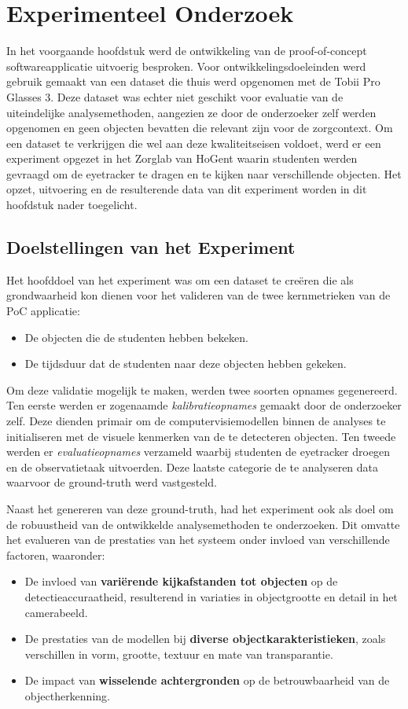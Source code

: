 \chapter{Experimenteel Onderzoek}
\label{ch:experiment}

In het voorgaande hoofdstuk werd de ontwikkeling van de proof-of-concept softwareapplicatie uitvoerig besproken.
Voor ontwikkelingsdoeleinden werd gebruik gemaakt van een dataset die thuis werd opgenomen met de Tobii Pro Glasses 3.
Deze dataset was echter niet geschikt voor evaluatie van de uiteindelijke analysemethoden, aangezien ze door de onderzoeker zelf werden opgenomen en geen objecten bevatten die relevant zijn voor de zorgcontext.
Om een dataset te verkrijgen die wel aan deze kwaliteitseisen voldoet, werd er een experiment opgezet in het Zorglab van HoGent waarin studenten werden gevraagd om de eyetracker te dragen en te kijken naar verschillende objecten.
Het opzet, uitvoering en de resulterende data van dit experiment worden in dit hoofdstuk nader toegelicht.

\section{Doelstellingen van het Experiment}

Het hoofddoel van het experiment was om een dataset te creëren die als grondwaarheid kon dienen voor het valideren van de twee kernmetrieken van de PoC applicatie:
\begin{itemize}
    \item De objecten die de studenten hebben bekeken.
    \item De tijdsduur dat de studenten naar deze objecten hebben gekeken.
\end{itemize}
Om deze validatie mogelijk te maken, werden twee soorten opnames gegenereerd. 
Ten eerste werden er zogenaamde \textit{kalibratieopnames} gemaakt door de onderzoeker zelf. 
Deze dienden primair om de computervisiemodellen binnen de analyses te initialiseren met de visuele kenmerken van de te detecteren objecten. 
Ten tweede werden er \textit{evaluatieopnames} verzameld waarbij studenten de eyetracker droegen en de observatietaak uitvoerden. 
Deze laatste categorie de te analyseren data waarvoor de ground-truth werd vastgesteld.

Naast het genereren van deze ground-truth, had het experiment ook als doel om de robuustheid van de ontwikkelde analysemethoden te onderzoeken. 
Dit omvatte het evalueren van de prestaties van het systeem onder invloed van verschillende factoren, waaronder:
\begin{itemize}
    \item De invloed van \textbf{variërende kijkafstanden tot objecten} op de detectieaccuraatheid, resulterend in variaties in objectgrootte en detail in het camerabeeld.
    \item De prestaties van de modellen bij \textbf{diverse objectkarakteristieken}, zoals verschillen in vorm, grootte, textuur en mate van transparantie.
    \item De impact van \textbf{wisselende achtergronden} op de betrouwbaarheid van de objectherkenning.
\end{itemize}

